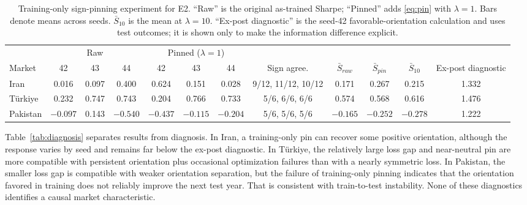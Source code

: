 \documentclass[12pt]{article}
\begin{document}
\begin{table}[htbp]
\centering
\caption{Training-only sign-pinning experiment for E2. ``Raw'' is the original as-trained Sharpe; ``Pinned'' adds \eqref{eq:pin} with $\lambda=1$. Bars denote means across seeds. $\bar S_{10}$ is the mean at $\lambda=10$. ``Ex-post diagnostic'' is the seed-42 favorable-orientation calculation and uses test outcomes; it is shown only to make the information difference explicit.}
\label{tab:pin}
\scriptsize
\setlength{\tabcolsep}{3pt}
\begin{tabular}{l ccc ccc ccccc}
\toprule
 & \multicolumn{3}{c}{Raw} & \multicolumn{3}{c}{Pinned ($\lambda=1$)} & & & & \\
\cmidrule(lr){2-4}\cmidrule(lr){5-7}
Market & 42 & 43 & 44 & 42 & 43 & 44 & Sign agree. & $\bar S_{raw}$ & $\bar S_{pin}$ & $\bar S_{10}$ & Ex-post diagnostic \\
\midrule
Iran & 0.016 & 0.097 & 0.400 & 0.624 & 0.151 & 0.028 & 9/12, 11/12, 10/12 & 0.171 & 0.267 & 0.215 & 1.332 \\
T\"urkiye & 0.232 & 0.747 & 0.743 & 0.204 & 0.766 & 0.733 & 5/6, 6/6, 6/6 & 0.574 & 0.568 & 0.616 & 1.476 \\
Pakistan & $-0.097$ & 0.143 & $-0.540$ & $-0.437$ & $-0.115$ & $-0.204$ & 5/6, 5/6, 5/6 & $-0.165$ & $-0.252$ & $-0.278$ & 1.222 \\
\bottomrule
\end{tabular}
\end{table}

Table~\ref{tab:diagnosis} separates results from diagnosis. In Iran, a training-only pin can recover some positive orientation, although the response varies by seed and remains far below the ex-post diagnostic. In T\"urkiye, the relatively large loss gap and near-neutral pin are more compatible with persistent orientation plus occasional optimization failures than with a nearly symmetric loss. In Pakistan, the smaller loss gap is compatible with weaker orientation separation, but the failure of training-only pinning indicates that the orientation favored in training does not reliably improve the next test year. That is consistent with train-to-test instability. None of these diagnostics identifies a causal market characteristic.
\end{document}
